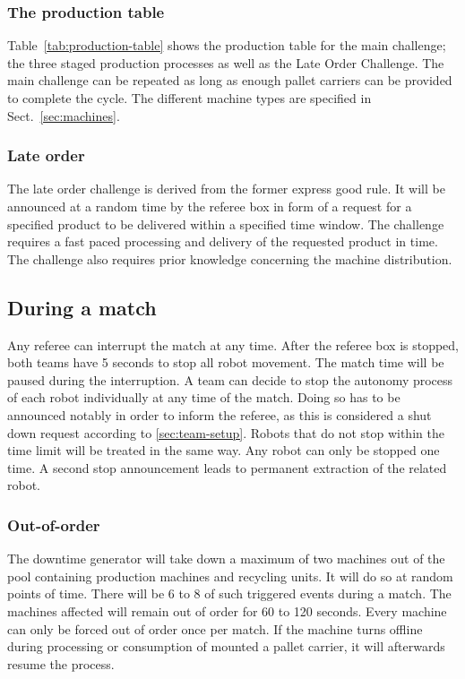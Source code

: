 \documentclass[12pt,twoside]{article}
\begin{document}
\subsubsection{The production table}

Table~\ref{tab:production-table} shows the production table for the
main challenge; the three staged production processes as well as the
Late Order Challenge. The main challenge can be repeated as long as
enough pallet carriers can be provided to complete the cycle. The
different machine types are specified in Sect.~\ref{sec:machines}.



\subsubsection{Late order}

The late order challenge is derived from the former express good
rule. It will be announced at a random time by the referee box in form of a
request for a specified product to be delivered within a specified time
window. The challenge requires a fast paced processing and delivery of
the requested product in time. The challenge also requires prior
knowledge concerning the machine distribution.

\subsection{During a match}

Any referee can interrupt the match at any time. After the referee box
is stopped, both teams have 5 seconds to stop all robot movement. The
match time will be paused during the interruption. A team can decide to
stop the autonomy process of each robot individually at any time of the
match. Doing so has to be announced notably in order to inform the
referee, as this is considered a shut down request according to
\ref{sec:team-setup}. Robots that do not stop within the time limit
will be treated in the same way. Any robot can only be stopped one
time. A second stop announcement leads to permanent extraction of the
related robot.

\subsubsection{Out-of-order}

The downtime generator will take down a maximum of two machines out of
the pool containing production machines and recycling units. It will
do so at random points of time. There will be 6 to 8 of such triggered
events during a match. The machines affected will remain out of order
for 60 to 120 seconds. Every machine can only be forced out of order
once per match. If the machine turns offline during processing or
consumption of mounted a pallet carrier, it will afterwards resume the
process.
\end{document}
